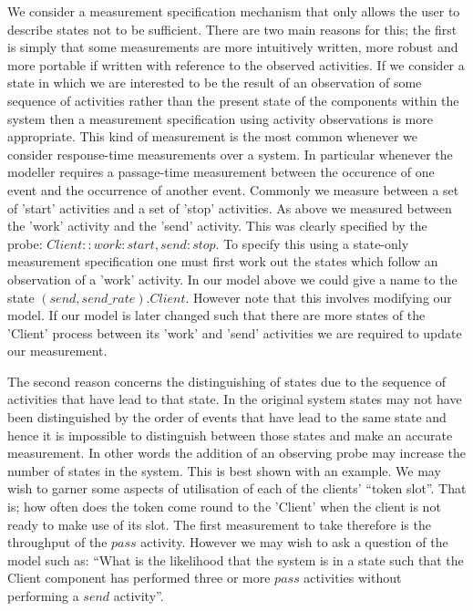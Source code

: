 \documentclass[times, 10pt,twocolumn]{article}
\newcommand{\showprobe}[1]{$#1$}
\newcommand{\quoteActivity}[1]{$#1$}
\begin{document}
We consider a measurement specification mechanism that only allows the 
user to describe states not to be sufficient.
There are two main reasons for this; the first is simply that some
measurements are more intuitively written, more robust and more portable
if written with reference to the observed activities.
If we consider a state in which we are interested to be the result of
an observation of some sequence of activities rather than the present state
of the components within the system then a measurement specification
using activity observations is more appropriate.
This kind of measurement is the most common whenever we consider response-time
measurements over a system. In particular whenever the modeller requires a
passage-time measurement between the occurence of one event and the occurrence
of another event. Commonly we measure between a set of 'start' activities and
a set of 'stop' activities. As above we measured between the 'work' activity
and the 'send' activity. This was clearly specified by the probe:
\showprobe{ Client:: work:start, send:stop }.
To specify this using a state-only measurement specification one must first
work out the states which follow an observation of a 'work' activity.
In our model above we could give a name to the state $(send, send\_rate).Client$.
However note that this involves modifying our model. If our model is later
changed such that there are more states of the 'Client' process between its
'work' and 'send' activities we are required to update our measurement.

The second reason concerns the distinguishing of states due to the sequence
of activities that have lead to that state. In the original system states
may not have been distinguished by the order of events that have lead
to the same state and hence it is impossible to distinguish between those
states and make an accurate measurement. In other words the addition
of an observing probe may increase the number of states in the system.
This is best shown with an example. We may wish to garner some aspects of
utilisation of each of the clients' ``token slot''. That is; how often 
does the token come round to the 'Client' when the client is not ready
to make use of its slot. The first measurement to take therefore is the
throughput of the \quoteActivity{pass} activity.
However we may wish to ask a question of the model such as:
``What is the likelihood that the system is in a state such that the
Client component has performed three or more \quoteActivity{pass} activities
without performing a \quoteActivity{send} activity''.
\end{document}
